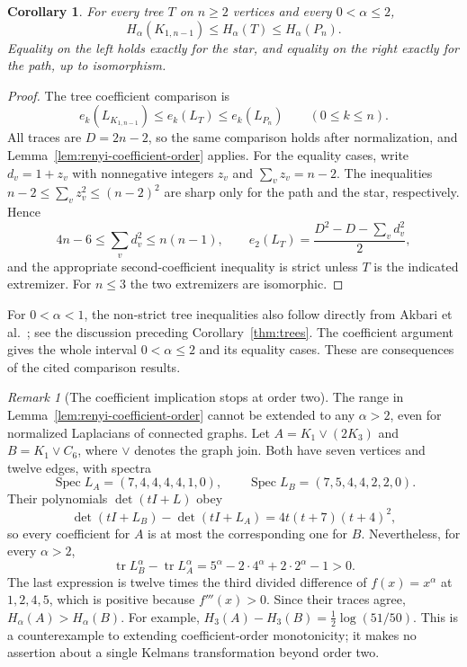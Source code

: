 \documentclass[11pt,a4paper,reqno]{amsart}
\newtheorem{corollary}[theorem]{Corollary}
\theoremstyle{remark}
\newtheorem{remark}[theorem]{Remark}
\newcommand{\tr}{\operatorname{tr}}
\newcommand{\Spec}{\operatorname{Spec}}
\numberwithin{equation}{section}
\begin{document}
\begin{corollary}\label{cor:tree-renyi-extrema}
For every tree $T$ on $n\ge2$ vertices and every
$0<\alpha\le2$,
\[
 H_\alpha(K_{1,n-1})\le H_\alpha(T)\le H_\alpha(P_n).
\]
Equality on the left holds exactly for the star, and equality on
the right exactly for the path, up to isomorphism.
\end{corollary}
\begin{proof}
The tree coefficient comparison \cite[Eq.~(2)]{Mohar2007} is
\[
 e_k(L_{K_{1,n-1}})\le e_k(L_T)\le e_k(L_{P_n})
 \qquad(0\le k\le n).
\]
All traces are $D=2n-2$, so the same comparison holds after
normalization, and Lemma~\ref{lem:renyi-coefficient-order} applies.
For the equality cases, write $d_v=1+z_v$ with nonnegative integers
$z_v$ and $\sum_vz_v=n-2$. The inequalities
$n-2\le\sum_vz_v^2\le(n-2)^2$ are sharp only for the path and
the star, respectively. Hence
\[
 4n-6\le\sum_vd_v^2\le n(n-1),\qquad
 e_2(L_T)=\frac{D^2-D-\sum_vd_v^2}{2},
\]
and the appropriate second-coefficient inequality is strict unless
$T$ is the indicated extremizer. For $n\le3$ the two extremizers
are isomorphic.
\end{proof}

For $0<\alpha<1$, the non-strict tree inequalities also follow directly
from Akbari et al.~\cite[Corollary 7]{Akbari2010}; see the discussion
preceding Corollary~\ref{thm:trees}. The coefficient argument gives the
whole interval $0<\alpha\le2$ and its equality cases. These are
consequences of the cited comparison results.

\begin{remark}[The coefficient implication stops at order two]
The range in Lemma~\ref{lem:renyi-coefficient-order} cannot be
extended to any $\alpha>2$, even for normalized Laplacians of
connected graphs. Let $A=K_1\vee(2K_3)$ and $B=K_1\vee C_6$,
where $\vee$ denotes the graph join. Both have seven vertices and
twelve edges, with spectra
\[
 \Spec L_A=(7,4,4,4,4,1,0),\qquad
 \Spec L_B=(7,5,4,4,2,2,0).
\]
Their polynomials $\det(tI+L)$ obey
\[
 \det(tI+L_B)-\det(tI+L_A)=4t(t+7)(t+4)^2,
\]
so every coefficient for $A$ is at most the corresponding one for
$B$. Nevertheless, for every $\alpha>2$,
\[
 \tr L_B^\alpha-\tr L_A^\alpha
 =5^\alpha-2\cdot4^\alpha+2\cdot2^\alpha-1>0.
\]
The last expression is twelve times the third divided difference
of $f(x)=x^\alpha$ at $1,2,4,5$, which is positive because
$f'''(x)>0$. Since their traces agree, $H_\alpha(A)>H_\alpha(B)$.
For example, $H_3(A)-H_3(B)=\tfrac12\log(51/50)$.
This is a counterexample to extending coefficient-order
monotonicity; it makes no assertion about a single Kelmans
transformation beyond order two.
\end{remark}
\end{document}
